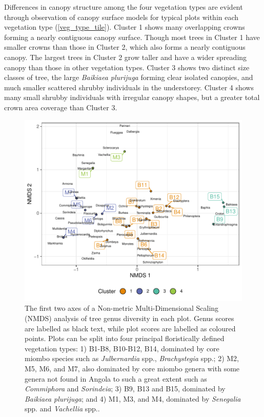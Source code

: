 \documentclass[11pt,a4paper]{article}
\begin{document}
Differences in canopy structure among the four vegetation types are evident through observation of canopy surface models for typical plots within each vegetation type (\autoref{veg_type_tile}). Cluster 1 shows many overlapping crowns forming a nearly contiguous canopy surface. Though most trees in Cluster 1 have smaller crowns than those in Cluster 2, which also forms a nearly contiguous canopy. The largest trees in Cluster 2 grow taller and have a wider spreading canopy than those in other vegetation types. Cluster 3 shows two distinct size classes of tree, the large \textit{Baikiaea plurijuga} forming clear isolated canopies, and much smaller scattered shrubby individuals in the understorey. Cluster 4 shows many small shrubby individuals with irregular canopy shapes, but a greater total crown area coverage than Cluster 3. 

\begin{figure}
	\includegraphics[width=\linewidth]{nmds}
	\caption[NMDS of plots based on genera basal area abundance]{The first two axes of a Non-metric Multi-Dimensional Scaling (NMDS) analysis of tree genus diversity in each plot. Genus scores are labelled as black text, while plot scores are labelled as coloured points. Plots can be split into four principal floristically defined vegetation types: 1) B1-B8, B10-B12, B14, dominated by core miombo species such as \textit{Julbernardia} spp., \textit{Brachystegia} spp.; 2) M2, M5, M6, and M7, also dominated by core miombo genera with some genera not found in Angola to such a great extent such as \textit{Commiphora} and \textit{Sorindeia}; 3) B9, B13 and B15, dominated by \textit{Baikiaea plurijuga}; and 4) M1, M3, and M4, dominated by \textit{Senegalia} spp. and \textit{Vachellia} spp..}
	\label{nmds}
\end{figure}
\end{document}
